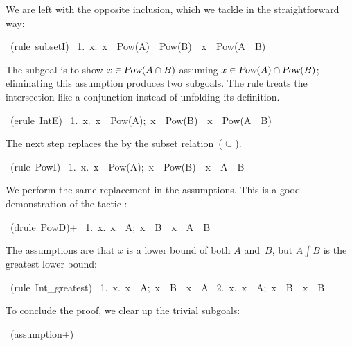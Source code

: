We are left with the opposite inclusion, which we tackle in the
straightforward way:
\begin{isabelle}
\ (rule\ subsetI)\isanewline
\ 1.\ \isasymAnd x.\ x\ \isasymin \ Pow(A)\ \isasyminter \ Pow(B)\ \isasymLongrightarrow \ x\ \isasymin \ Pow(A\ \isasyminter \ B)
\end{isabelle}
The subgoal is to show $x\in \emph{\sl Pow}(A\cap B)$ assuming $x\in\emph{\sl Pow}(A)\cap \emph{\sl Pow}(B)$; eliminating this assumption produces two
subgoals.  The rule  treats the intersection like a conjunction
instead of unfolding its definition.
\begin{isabelle}
\ (erule\ IntE)\isanewline
\ 1.\ \isasymAnd x.\ \isasymlbrakk x\ \isasymin \ Pow(A);\ x\ \isasymin \ Pow(B)\isasymrbrakk \ \isasymLongrightarrow \ x\ \isasymin \ Pow(A\ \isasyminter \ B)
\end{isabelle}
The next step replaces the  by the subset
relation~($\subseteq$).
\begin{isabelle}
\ (rule\ PowI)\isanewline
\ 1.\ \isasymAnd x.\ \isasymlbrakk x\ \isasymin \ Pow(A);\ x\ \isasymin \ Pow(B)\isasymrbrakk \ \isasymLongrightarrow \ x\ \isasymsubseteq \ A\ \isasyminter \ B%
\end{isabelle}
We perform the same replacement in the assumptions.  This is a good
demonstration of the tactic :
\begin{isabelle}
\ (drule\ PowD)+\isanewline
\ 1.\ \isasymAnd x.\ \isasymlbrakk x\ \isasymsubseteq \ A;\ x\ \isasymsubseteq \ B\isasymrbrakk \ \isasymLongrightarrow \ x\ \isasymsubseteq \ A\ \isasyminter \ B%
\end{isabelle}
The assumptions are that $x$ is a lower bound of both $A$ and~$B$, but
$A\int B$ is the greatest lower bound:
\begin{isabelle}
\ (rule\ Int\_greatest)\isanewline
\ 1.\ \isasymAnd x.\ \isasymlbrakk x\ \isasymsubseteq \ A;\ x\ \isasymsubseteq \ B\isasymrbrakk \ \isasymLongrightarrow \ x\ \isasymsubseteq \ A\isanewline
\ 2.\ \isasymAnd x.\ \isasymlbrakk x\ \isasymsubseteq \ A;\ x\ \isasymsubseteq \ B\isasymrbrakk \ \isasymLongrightarrow \ x\ \isasymsubseteq \ B%
\end{isabelle}
To conclude the proof, we clear up the trivial subgoals:
\begin{isabelle}
\ (assumption+)\isanewline
{}%
\end{isabelle}

